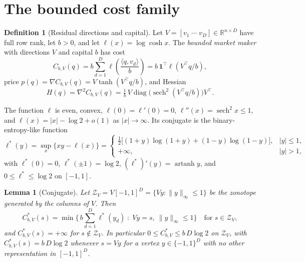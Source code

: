 \documentclass[11pt]{article}
\newtheorem{lemma}[theorem]{Lemma}
\theoremstyle{definition}
\newtheorem{definition}[theorem]{Definition}
\theoremstyle{remark}
\newcommand{\R}{\mathbb{R}}
\newcommand{\ip}[2]{\langle #1,#2\rangle}
\newcommand{\lc}{\ell}
\newcommand{\lcs}{\ell^{*}}
\newcommand{\artanh}{\operatorname{artanh}}
\newcommand{\sech}{\operatorname{sech}}
\newcommand{\diag}{\operatorname{diag}}
\newcommand{\zono}{\mathcal{Z}}
\begin{document}
\section{The bounded cost family}\label{sec:bounded}

\begin{definition}[Residual directions and capital]
Let $V=[v_1\;\cdots\;v_D]\in\R^{n\times D}$ have full row rank, let $b>0$, and let $\lc(x)=\log\cosh x$. The
\emph{bounded market maker} with directions $V$ and capital $b$ has cost
\begin{equation}\label{eq:cost}
C_{b,V}(q)=b\sum_{d=1}^{D}\lc\!\left(\frac{\ip{q}{v_d}}{b}\right)=b\,\mathbf 1^{\top}\lc\!\left(V^{\top}q/b\right),
\end{equation}
price $p(q)=\nabla C_{b,V}(q)=V\tanh(V^{\top}q/b)$, and Hessian
\begin{equation}\label{eq:hess}
H(q)=\nabla^{2}C_{b,V}(q)=\tfrac1b\,V\diag\!\big(\sech^{2}(V^{\top}q/b)\big)V^{\top}.
\end{equation}
\end{definition}

The function $\lc$ is even, convex, $\lc(0)=\lc'(0)=0$, $\lc''(x)=\sech^2 x\le 1$, and $\lc(x)=|x|-\log 2+o(1)$ as
$|x|\to\infty$. Its conjugate is the binary-entropy-like function
\begin{equation}\label{eq:lcs}
\lcs(y)=\sup_x\{xy-\lc(x)\}=
\begin{cases}
\tfrac12\big[(1+y)\log(1+y)+(1-y)\log(1-y)\big], & |y|\le 1,\\
+\infty, & |y|>1,
\end{cases}
\end{equation}
with $\lcs(0)=0$, $\lcs(\pm1)=\log 2$, $(\lcs)'(y)=\artanh y$, and $0\le\lcs\le\log 2$ on $[-1,1]$.

\begin{lemma}[Conjugate]\label{lem:conj}
Let $\zono_V=V[-1,1]^{D}=\{Vy:\|y\|_\infty\le1\}$ be the zonotope generated by the columns of $V$. Then
\begin{equation}\label{eq:conj}
C_{b,V}^{*}(s)=\min\Big\{\,b\sum_{d=1}^{D}\lcs(y_d)\;:\;Vy=s,\ \|y\|_\infty\le 1\Big\}
\quad\text{for }s\in\zono_V,
\end{equation}
and $C_{b,V}^{*}(s)=+\infty$ for $s\notin\zono_V$. In particular $0\le C_{b,V}^{*}\le b\,D\log 2$ on $\zono_V$,
with $C^{*}_{b,V}(s)=b\,D\log2$ whenever $s=Vy$ for a vertex $y\in\{-1,1\}^D$ with no other representation in
$[-1,1]^{D}$.
\end{lemma}
\end{document}
